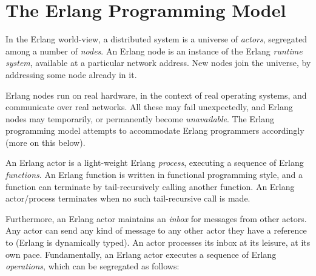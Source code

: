 \section{The Erlang Programming Model}



In the Erlang world-view, a distributed system is a universe of
\emph{actors}, segregated among a number of \emph{nodes}. An Erlang
node is an instance of the Erlang \emph{runtime system}, available at
a particular network address. New nodes join the universe, by
addressing some node already in it.

Erlang nodes run on real hardware, in the context of real operating
systems, and communicate over real networks. All these may fail
unexpectedly, and Erlang nodes may temporarily, or permanently become
\emph{unavailable}. The Erlang programming model attempts to
accommodate Erlang programmers accordingly (more on this below).

An Erlang actor is a light-weight Erlang \emph{process}, executing a
sequence of Erlang \emph{functions}. An Erlang function is written in
functional programming style, and a function can terminate by
tail-recursively calling another function. An Erlang actor/process
terminates when no such tail-recursive call is made.

Furthermore, an Erlang actor maintains an \emph{inbox} for messages
from other actors. Any actor can send any kind of message to any other
actor they have a reference to (Erlang is dynamically typed). An actor
processes its inbox at its leisure, at its own pace. Fundamentally, an
Erlang actor executes a sequence of Erlang \emph{operations}, which
can be segregated as follows:

